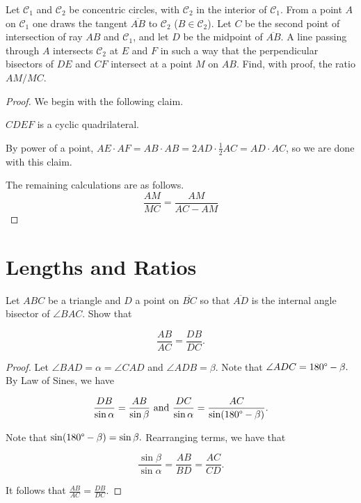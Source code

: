 \documentclass[letterpaper,oneside]{scrartcl}
\begin{document}
\begin{problem*}
  [2.32, USAMO 1998/2]
  Let $\mathcal{C}_1$ and $\mathcal{C}_2$ be concentric circles, with $\mathcal{C}_2$ in the interior of $\mathcal{C}_1$. From a point $A$ on $\mathcal{C}_1$ one draws the tangent $\overline{AB}$ to $\mathcal{C}_2$  ($B \in  \mathcal{C}_2$). Let $C$ be the second point of intersection of ray $AB$ and $\mathcal{C}_1$, and let $D$ be the midpoint of $\overline{AB}$. A line passing through $A$ intersects $\mathcal{C}_2$ at $E$ and $F$ in such a way that the perpendicular bisectors of $DE$ and $CF$ intersect at a point $M$ on $AB$. Find, with proof, the ratio $AM/MC$.
\end{problem*}
\begin{proof}  We begin with the following claim.
  \begin{claim*}
    \(CDEF\) is a cyclic quadrilateral.
  \end{claim*}
  \begin{subproof}
     By power of a point, \(AE \cdot AF = AB \cdot AB = 2AD \cdot \frac{1}{2}AC = AD\cdot AC\), so we are done with this claim.
  \end{subproof}
  The remaining calculations are as follows.
  \[\frac{AM}{MC} = \frac{AM}{AC - AM}\]
\end{proof}
\newpage
\section{Lengths and Ratios}
\begin{theorem*}
     Let $ABC$ be a triangle and $D$ a point on $\overline{BC}$ so that $\overline{AD}$ is the internal angle bisector of $\angle BAC.$ Show that

  $$\frac{AB}{AC} = \frac{DB}{DC}.$$
\end{theorem*}

\begin{proof}  Let $\angle BAD = \alpha = \angle CAD$ and $\angle ADB = \beta.$ Note that $\angle ADC = 180\degree - \beta.$ By Law of Sines, we have

  $$\frac{DB}{\sin\alpha} = \frac{AB}{\sin\beta} \text{  and  } \frac{DC}{\sin\alpha} = \frac{AC}{\sin(180\degree - \beta)}.$$

  Note that $\sin(180\degree-\beta) = \sin\beta.$ Rearranging terms, we have that

  $$\frac{\sin\beta}{\sin\alpha} = \frac{AB}{BD} = \frac{AC}{CD}.$$

  It follows that $\frac{AB}{AC} = \frac{DB}{DC}.$
\end{proof}
\end{document}
